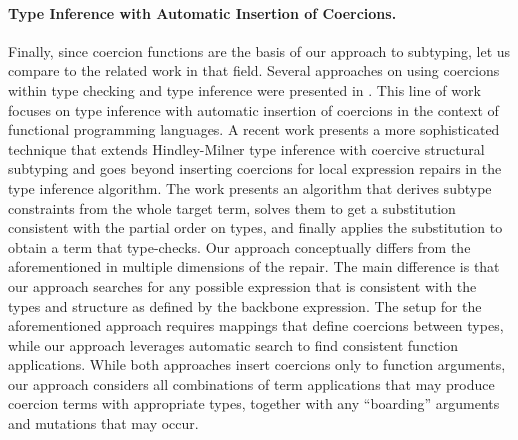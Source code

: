 \paragraph{{\bf Type Inference with Automatic Insertion of Coercions.}}
Finally, since coercion functions are the basis of our approach to subtyping, let us compare to the related work in that field. Several approaches on using coercions within type checking and type inference
were presented in \cite{Mitchell:1984:CTI:800017.800529,Luo:2008:CPT:1394781.1394785}.
This line of work focuses on type inference with automatic insertion of coercions in the
context of functional programming languages.
A recent work \cite{Traytel:2011:EHT:2183641.2183654} presents a more sophisticated technique that extends Hindley-Milner
type inference with coercive structural subtyping and goes beyond inserting coercions for
local expression repairs in the type inference algorithm.
The work presents an algorithm that derives subtype constraints from the whole target
term, solves them to get a substitution consistent with the partial order on types, and
finally applies the substitution to obtain a term that type-checks.
Our approach conceptually differs from the aforementioned in multiple dimensions of the
repair.
The main difference is that our approach searches for any possible expression that is
consistent with the types and structure as defined by the backbone expression.
The setup for the aforementioned approach requires mappings that define
coercions between types, while our approach leverages automatic search to find
consistent function applications.
While both approaches insert coercions only to function arguments, our approach
considers all combinations of term applications that may produce coercion terms with
appropriate types, together with any ``boarding'' arguments and mutations that may occur.




